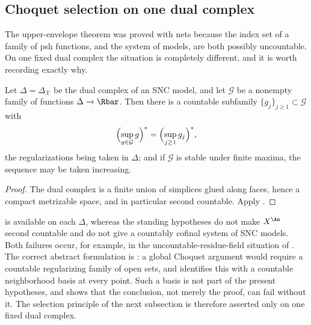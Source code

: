 \subsection{Choquet selection on one dual complex}
\label{sec:ch23-choquet-on-delta}

The upper-envelope theorem was proved with nets because the index set of a
family of psh functions, and the system of models, are both possibly
uncountable.  On one fixed dual complex the situation is completely
different, and it is worth recording exactly why.

\begin{proposition}
\label{prop:ch23-skeleton-choquet}
Let $\Delta=\Delta_{\mathcal X}$ be the dual complex of an SNC model, and
let $\mathcal G$ be a nonempty family of functions
$\Delta\to\Rbar$.  Then there is a countable subfamily
$\{g_j\}_{j\geq1}\subset\mathcal G$ with
\begin{equation}\label{eq:ch23-choquet-on-delta}
 \Bigl(\sup_{g\in\mathcal G}g\Bigr)^{*}
 =\Bigl(\sup_{j\geq1}g_j\Bigr)^{*} ,
\end{equation}
the regularizations being taken in $\Delta$; and if $\mathcal G$ is
stable under finite maxima, the sequence may be taken increasing.
\end{proposition}

\begin{proof}
The dual complex is a finite union of simplices glued along faces, hence a
compact metrizable space, and in particular second countable.  Apply
.
\end{proof}

\begin{remark}
\label{rem:ch23-two-countability-regimes}
 is available on each $\Delta$, whereas the
standing hypotheses do not make $X^{\An}$ second countable and do not give a
countably cofinal system of SNC models.  Both failures occur, for example,
in the uncountable-residue-field situation of
.  The correct abstract formulation is
: a global Choquet argument would require a
countable regularizing family of open sets, and
 identifies this with a countable
neighborhood basis at every point.  Such a basis is not part of the present
hypotheses, and  shows that the conclusion,
not merely the proof, can fail without it.  The selection principle of the
next subsection is therefore asserted only on one fixed dual complex.
\end{remark}

